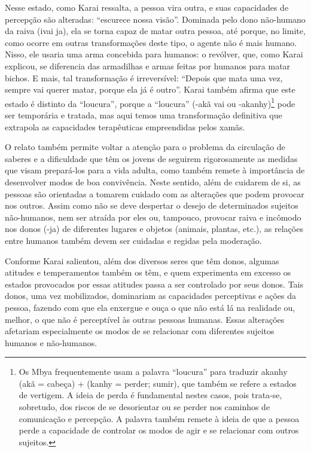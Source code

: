 \documentclass{article}
\begin{document}
Nesse estado, como Karai ressalta, a pessoa vira outra, e suas
capacidades de percep\c{c}\~ao s\~ao alteradas:
{\textquotedblleft}escurece nossa vis\~ao{\textquotedblright}. Dominada
pelo dono n\~ao-humano da raiva (ivai ja), ela se torna capaz de matar
outra pessoa, at\'e porque, no limite, como ocorre em outras
transforma\c{c}\~oes deste tipo, o agente n\~ao \'e mais humano. Nisso,
ele usaria uma arma concebida para humanos: o rev\'olver, que, como
Karai explicou, se diferencia das armadilhas e armas feitas por humanos
para matar bichos. E mais, tal transforma\c{c}\~ao \'e irrevers\'ivel:
{\textquotedblleft}Depois que mata uma vez, sempre vai querer matar,
porque ela j\'a \'e outro{\textquotedblright}. Karai tamb\'em afirma
que este estado \'e distinto da
{\textquotedblleft}loucura{\textquotedblright}, porque a
{\textquotedblleft}loucura{\textquotedblright} (-ak\~a vai ou
{}-akanhy)\footnote{ Os Mbya frequentemente usam a palavra
{\textquotedblleft}loucura{\textquotedblright} para traduzir akanhy
(ak\~a = cabe\c{c}a) + (kanhy = perder; sumir), que tamb\'em se refere
a estados de vertigem. A ideia de perda \'e fundamental nestes casos,
pois trata-se, sobretudo, dos riscos de se desorientar ou se perder nos
caminhos de comunica\c{c}\~ao e percep\c{c}\~ao. A palavra tamb\'em
remete \`a ideia de que a pessoa perde a capacidade de controlar os
modos de agir e se relacionar com outros sujeitos. } pode ser
tempor\'aria e tratada, mas aqui temos uma transforma\c{c}\~ao
definitiva que extrapola as capacidades terap\^euticas empreendidas
pelos xam\~as. 

O relato tamb\'em permite voltar a aten\c{c}\~ao para o problema da
circula\c{c}\~ao de saberes e a dificuldade que t\^em os jovens de
seguirem rigorosamente as medidas que visam prepar\'a-los para a vida
adulta, como tamb\'em remete \`a import\^ancia de desenvolver modos de
boa conviv\^encia. Neste sentido, al\'em de cuidarem de si, as pessoas
s\~ao orientadas a tomarem cuidado com as altera\c{c}\~oes que podem
provocar nos outros. Assim como n\~ao se deve despertar o desejo de
determinados sujeitos n\~ao-humanos, nem ser atra\'ida por eles ou,
tampouco, provocar raiva e inc\^omodo nos donos (-ja) de diferentes
lugares e objetos (animais, plantas, etc.), as rela\c{c}\~oes entre
humanos tamb\'em devem ser cuidadas e regidas pela modera\c{c}\~ao. 

Conforme Karai salientou, al\'em dos diversos seres que t\^em donos,
algumas atitudes e temperamentos tamb\'em os t\^em, e quem experimenta
em excesso os estados provocados por essas atitudes passa a ser
controlado por seus donos. Tais donos, uma vez mobilizados, dominariam
as capacidades perceptivas e a\c{c}\~oes da pessoa, fazendo com que ela
enxergue e ou\c{c}a o que n\~ao est\'a l\'a na realidade ou, melhor, o
que n\~ao \'e percept\'ivel \`as outras pessoas humanas. Essas
altera\c{c}\~oes afetariam especialmente os modos de se relacionar com
diferentes sujeitos humanos e n\~ao-humanos.
\end{document}
